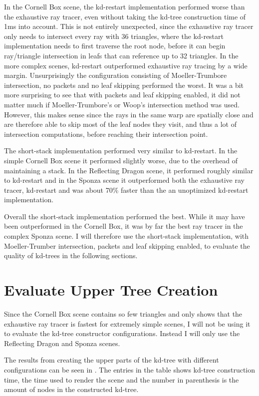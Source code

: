In the Cornell Box scene, the kd-restart implementation performed worse than the
exhaustive ray tracer, even without taking the kd-tree construction time of 1ms
into account. This is not entirely unexpected, since the exhaustive ray tracer
only needs to intersect every ray with 36 triangles, where the kd-restart
implementation needs to first traverse the root node, before it can begin
ray/triangle intersection in leafs that can reference up to 32 triangles. In the
more complex scenes, kd-restart outperformed exhaustive ray tracing by a wide
margin. Unsurprisingly the configuration consisting of Moeller-Trumbore
intersection, no packets and no leaf skipping performed the worst. It was a bit
more surprising to see that with packets and leaf skipping enabled, it did not
matter much if Moeller-Trumbore's or Woop's intersection method was
used. However, this makes sense since the rays in the same warp are spatially
close and are therefore able to skip most of the leaf nodes they visit, and thus
a lot of intersection computations, before reaching their intersection point.

The short-stack implementation performed very similar to kd-restart. In the
simple Cornell Box scene it performed slightly worse, due to the overhead of
maintaining a stack. In the Reflecting Dragon scene, it performed roughly
similar to kd-restart and in the Sponza scene it outperformed both the
exhaustive ray tracer, kd-restart and was about 70\% faster than the an
unoptimized kd-restart implementation.

Overall the short-stack implementation performed the best. While it may have
been outperformed in the Cornell Box, it was by far the best ray tracer in the
complex Sponza scene. I will therefore use the short-stack implementation, with
Moeller-Trumber intersection, packets and leaf skipping enabled, to evaluate the
quality of kd-trees in the following sections.


\section{Evaluate Upper Tree Creation}\label{sec:evaluateUpperTree}

Since the Cornell Box scene contains so few triangles and only shows that the
exhaustive ray tracer is fastest for extremely simple scenes, I will not be
using it to evaluate the kd-tree constructor configurations. Instead I will only
use the Reflecting Dragon and Sponza scenes.

The results from creating the upper parts of the kd-tree with different
configurations can be seen in . The entries in the
table shows kd-tree construction time, the time used to render the scene and the
number in parenthesis is the amount of nodes in the constructed kd-tree.


